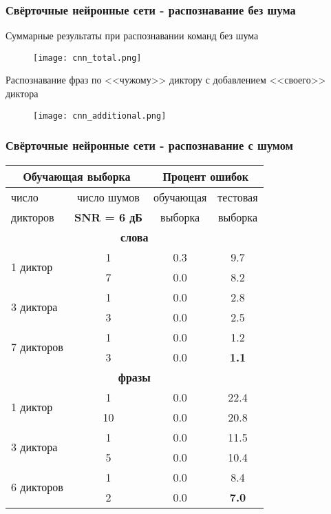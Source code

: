\begin{frame}
\frametitle{\normalsize Свёрточные нейронные сети - распознавание без шума}
\footnotesize
\vfill
Суммарные результаты при распознавании команд без шума
\vfill
\begin{figure}[h]
	\centering
	\texttt{[image: cnn\_total.png]}
\end{figure}
\vfill
Распознавание фраз по <<чужому>> диктору с добавлением <<своего>> диктора
\vfill
\begin{figure}[h]
	\centering
	\texttt{[image: cnn\_additional.png]}
\end{figure}
\vfill
\end{frame}

\begin{frame}
\frametitle{\normalsize Свёрточные нейронные сети - распознавание с шумом}
\footnotesize
\vfill
\begin{table}[h]
	\centering
	\begin{tabular}{| l | c || c | c |}
		\hline
		\multicolumn{2}{|c||}{Обучающая выборка}	& \multicolumn{2}{c|}{Процент ошибок}	\\
		\hline
		число			& число шумов			 	& обучающая & тестовая	\\
		дикторов		& \textbf{SNR = 6 дБ}		& выборка 	& выборка	\\
		\hline
		\multicolumn{4}{|c|}{\textbf{слова}} \\
		\hline
		\multirow{2}{*}{1 диктор}	& 1				& 0.3 		& 9.7  		\\
		\hhline{~---}
		& 7				& 0.0 		& 8.2  		\\
		\hline
		\multirow{2}{*}{3 диктора}	& 1				& 0.0 		& 2.8  		\\
		\hhline{~---}
		& 3				& 0.0 		& 2.5  		\\
		\hline
		\multirow{2}{*}{7 дикторов}	& 1				& 0.0 		& 1.2  		\\
		\hhline{~---}
		& 3				& 0.0 		& \textbf{1.1}  		\\
		\hline
		\multicolumn{4}{|c|}{\textbf{фразы}} \\
		\hline
		\multirow{2}{*}{1 диктор}	& 1				& 0.0 		& 22.4  	\\
		\hhline{~---}
		& 10			& 0.0 		& 20.8  	\\
		\hline
		\multirow{2}{*}{3 диктора}	& 1				& 0.0 		& 11.5  	\\
		\hhline{~---}
		& 5				& 0.0 		& 10.4  	\\
		\hline
		\multirow{2}{*}{6 дикторов}	& 1				& 0.0 		& 8.4  		\\
		\hhline{~---}
		& 2				& 0.0 		& \textbf{7.0}  		\\
		\hline
	\end{tabular}
\end{table}
\vfill
\end{frame}


